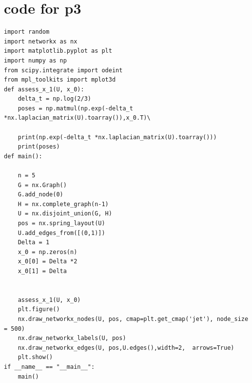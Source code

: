 \documentclass{article}
\begin{document}
\section*{code for p3}
\begin{verbatim}
import random
import networkx as nx
import matplotlib.pyplot as plt
import numpy as np
from scipy.integrate import odeint
from mpl_toolkits import mplot3d
def assess_x_1(U, x_0):
    delta_t = np.log(2/3)
    poses = np.matmul(np.exp(-delta_t *nx.laplacian_matrix(U).toarray()),x_0.T)\
    
    print(np.exp(-delta_t *nx.laplacian_matrix(U).toarray()))
    print(poses)
def main():

    n = 5
    G = nx.Graph()
    G.add_node(0)
    H = nx.complete_graph(n-1)
    U = nx.disjoint_union(G, H)
    pos = nx.spring_layout(U)
    U.add_edges_from([(0,1)])
    Delta = 1
    x_0 = np.zeros(n)
    x_0[0] = Delta *2
    x_0[1] = Delta
    
 
    assess_x_1(U, x_0)
    plt.figure()
    nx.draw_networkx_nodes(U, pos, cmap=plt.get_cmap('jet'), node_size = 500)
    nx.draw_networkx_labels(U, pos)
    nx.draw_networkx_edges(U, pos,U.edges(),width=2,  arrows=True)
    plt.show()
if __name__ == "__main__":
    main()



\end{verbatim}
\end{document}
